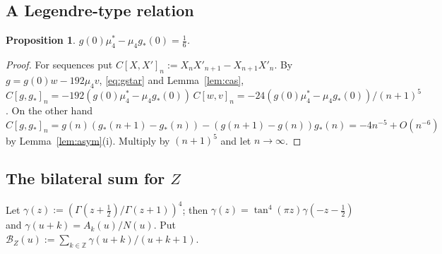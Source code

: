 \documentclass[11pt]{amsart}
\newtheorem{proposition}[theorem]{Proposition}
\theoremstyle{definition}
\theoremstyle{remark}
\numberwithin{equation}{section}
\newcommand{\Z}{\mathbb{Z}}
\begin{document}
\subsection{A Legendre-type relation}
\begin{proposition}\label{prop:legendre}
$g(0)\mu_4^*-\mu_4g_*(0)=\frac16$.
\end{proposition}
\begin{proof}
For sequences put $C[X,X']_n:=X_nX'_{n+1}-X_{n+1}X'_n$. By $g=g(0)w-192\mu_4v$, \eqref{eq:gstar} and Lemma~\ref{lem:cas},
$C[g,g_*]_n=-192(g(0)\mu_4^*-\mu_4g_*(0))\,C[w,v]_n=-24(g(0)\mu_4^*-\mu_4g_*(0))/(n+1)^5$. On the other hand $C[g,g_*]_n=g(n)(g_*(n+1)-g_*(n))-(g(n+1)-g(n))g_*(n)=-4n^{-5}+O(n^{-6})$ by Lemma~\ref{lem:asym}(i). Multiply by $(n+1)^5$ and let $n\to\infty$.
\end{proof}

\subsection{\texorpdfstring{The bilateral sum for $Z$}{The bilateral sum for Z}}
Let $\gamma(z):=(\Gamma(z+\frac12)/\Gamma(z+1))^4$; then $\gamma(z)=\tan^4(\pi z)\gamma(-z-\frac12)$ and $\gamma(u+k)=A_k(u)/N(u)$. Put $\mathcal B_Z(u):=\sum_{k\in\Z}\gamma(u+k)/(u+k+1)$.
\end{document}
